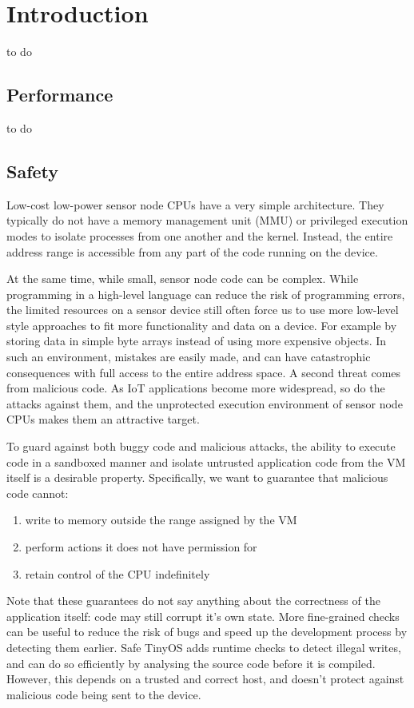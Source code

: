 \chapter{Introduction}
to do

\section{Performance}
to do

\section{Safety}
Low-cost low-power sensor node CPUs have a very simple architecture. They typically do not have a memory management unit (MMU) or privileged execution modes to isolate processes from one another and the kernel. Instead, the entire address range is accessible from any part of the code running on the device.

At the same time, while small, sensor node code can be complex. While programming in a high-level language can reduce the risk of programming errors, the limited resources on a sensor device still often force us to use more low-level style approaches to fit more functionality and data on a device. For example by storing data in simple byte arrays instead of using more expensive objects. In such an environment, mistakes are easily made, and  can have catastrophic consequences with full access to the entire address space. A second threat comes from malicious code. As IoT applications become more widespread, so do the attacks against them, and the unprotected execution environment of sensor node CPUs makes them an attractive target.

To guard against both buggy code and malicious attacks, the ability to execute code in a sandboxed manner and isolate untrusted application code from the VM itself is a desirable property. Specifically, we want to guarantee that malicious code cannot:
\begin{enumerate}
	\item write to memory outside the range assigned by the VM
	\item perform actions it does not have permission for
	\item retain control of the CPU indefinitely
\end{enumerate}

Note that these guarantees do not say anything about the correctness of the application itself: code may still corrupt it's own state. More fine-grained checks can be useful to reduce the risk of bugs and speed up the development process by detecting them earlier. Safe TinyOS \cite{Cooprider:2007ub} adds runtime checks to detect illegal writes, and can do so efficiently by analysing the source code before it is compiled. However, this depends on a trusted and correct host, and doesn't protect against malicious code being sent to the device.

